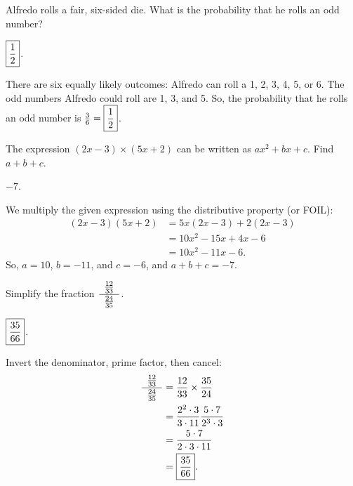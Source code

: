 \documentclass[11pt]{article}
\DeclareRobustCommand{\frac}[3][0pt]{%
  {\begingroup\hspace{#1}#2\hspace{#1}\endgroup\over\hspace{#1}#3\hspace{#1}}}
\begin{document}

\begin{problem}
Alfredo rolls a fair, six-sided die. What is the probability that he rolls an odd number?
\end{problem}

\begin{answer} $\boxed{\frac{1}{2}}$. \end{answer}
\begin{solution}
There are six equally likely outcomes: Alfredo can roll a 1, 2, 3, 4, 5, or 6. The odd numbers Alfredo could roll are 1, 3, and 5. So, the probability that he rolls an odd number is $\frac{3}{6} = \boxed{\frac{1}{2}}$.
\end{solution}

\begin{problem}
The expression $(2x - 3) \times (5x + 2)$ can be written as $ax^2 + bx + c$. Find $a + b+ c$.
\end{problem}

\begin{answer} $\boxed{-7}$. \end{answer}
\begin{solution}
We multiply the given expression using the distributive property (or FOIL):
\begin{align*}
(2x - 3)(5x + 2) &= 5x(2x - 3) + 2(2x - 3) \\
&= 10x^2 - 15x + 4x - 6 \\
&= 10x^2 - 11x - 6.
\end{align*}
So, $a = 10$, $b = -11$, and $c = -6$, and $a + b + c = \boxed{-7}$.
\end{solution}

\begin{problem}
Simplify the fraction $\displaystyle \frac[5pt]{\frac{12}{33}} {\frac{24}{35}}$.
\end{problem}

\begin{answer} $\boxed{\frac{35}{66}}$. \end{answer}
\begin{solution}
Invert the denominator, prime factor, then cancel:
\begin{align*}
\frac[5pt]{\frac{12}{33}} {\frac{24}{35}} &= \frac{12}{33} \times \frac{35}{24} \\
&= \frac{2^2 \cdot 3}{3 \cdot 11} \frac{5 \cdot 7}{2^3 \cdot 3} \\
&= \frac{5 \cdot 7}{2 \cdot 3 \cdot 11} \\
&= \boxed{\frac{35}{66}}.
\end{align*}
\end{solution}
\end{document}
